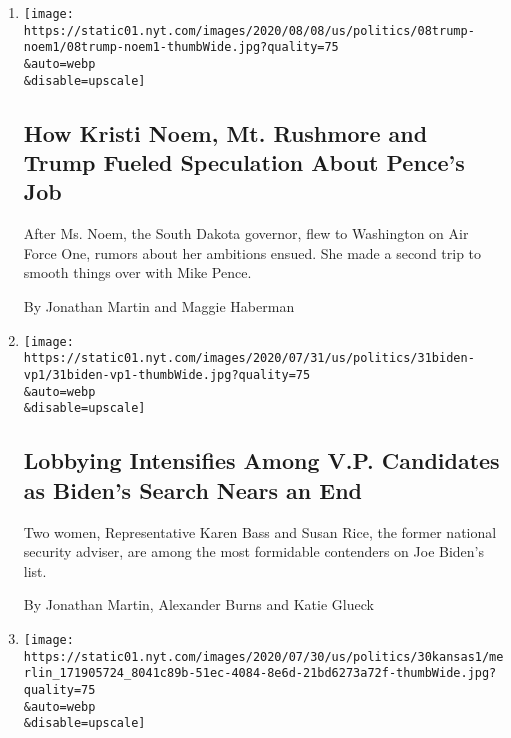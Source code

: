 \begin{enumerate}
\def\labelenumi{\arabic{enumi}.}
\item
  \href{/2020/08/08/us/politics/kristi-noem-pence-trump.html}{}

  \texttt{[image: https://static01.nyt.com/images/2020/08/08/us/politics/08trump-noem1/08trump-noem1-thumbWide.jpg?quality=75\\\&auto=webp\\\&disable=upscale]}

  \hypertarget{how-kristi-noem-mt-rushmore-and-trump-fueled-speculation-about-pences-job}{%
  \subsection{How Kristi Noem, Mt. Rushmore and Trump Fueled Speculation
  About Pence's
  Job}\label{how-kristi-noem-mt-rushmore-and-trump-fueled-speculation-about-pences-job}}

  After Ms. Noem, the South Dakota governor, flew to Washington on Air
  Force One, rumors about her ambitions ensued. She made a second trip
  to smooth things over with Mike Pence.

  By Jonathan Martin and Maggie Haberman
\item
  \href{/2020/07/31/us/politics/joseph-biden-vice-president.html}{}

  \texttt{[image: https://static01.nyt.com/images/2020/07/31/us/politics/31biden-vp1/31biden-vp1-thumbWide.jpg?quality=75\\\&auto=webp\\\&disable=upscale]}

  \hypertarget{lobbying-intensifies-among-vp-candidates-as-bidens-search-nears-an-end}{%
  \subsection{Lobbying Intensifies Among V.P. Candidates as Biden's
  Search Nears an
  End}\label{lobbying-intensifies-among-vp-candidates-as-bidens-search-nears-an-end}}

  Two women, Representative Karen Bass and Susan Rice, the former
  national security adviser, are among the most formidable contenders on
  Joe Biden's list.

  By Jonathan Martin, Alexander Burns and Katie Glueck
\item
  \href{/2020/07/30/us/politics/kansas-senate-kobach-trump.html}{}

  \texttt{[image: https://static01.nyt.com/images/2020/07/30/us/politics/30kansas1/merlin\_171905724\_8041c89b-51ec-4084-8e6d-21bd6273a72f-thumbWide.jpg?quality=75\\\&auto=webp\\\&disable=upscale]}


\end{enumerate}
